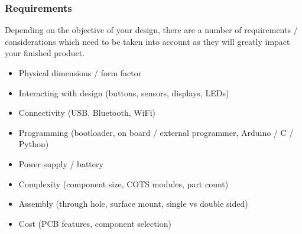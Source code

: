 \documentclass[aspectratio=169, t]{beamer}
\begin{document}
\begin{frame}
\frametitle{Requirements}
Depending on the objective of your design, there are a number of requirements / considerations which need to be taken into account as they will greatly impact your finished product. \\[10pt]

\begin{itemize}
	\item Physical dimensions / form factor
	\item Interacting with design (buttons, sensors, displays, LEDs)
	\item Connectivity (USB, Bluetooth, WiFi)
	\item Programming (bootloader, on board / external programmer, Arduino / C / Python)
	\item Power supply / battery
	\item Complexity (component size, COTS modules, part count)
	\item Assembly (through hole, surface mount, single vs double sided)
	\item Cost (PCB features, component selection)
\end{itemize}
\end{frame}
\end{document}
